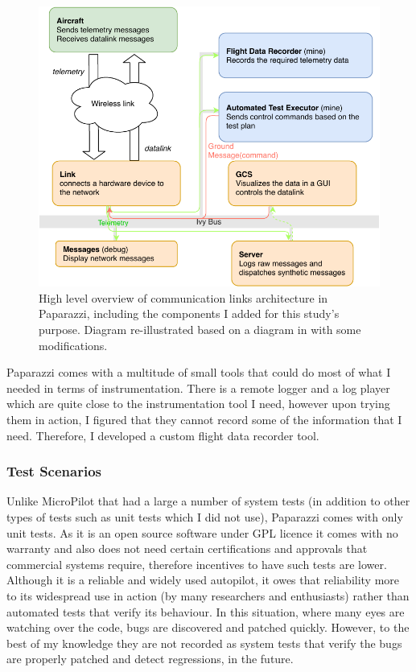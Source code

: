 \begin{figure}
    \centering
    \includegraphics[width=\columnwidth]{pprz_tester_files/Pprz_communication_agents.pdf}
    \caption{High level overview of communication links architecture in Paparazzi, including the components I added for this study's purpose. Diagram re-illustrated based on a diagram in \cite{hattenberger2014using} with some modifications.}
    \label{fig:paparazzi_comm_agents}
\end{figure}

Paparazzi comes with a multitude of small tools that could do most of what I needed in terms of instrumentation. There is a remote logger and a log player which are quite close to the instrumentation tool I need, however upon trying them in action, I figured that they cannot record some of the information that I need. Therefore, I developed a custom flight data recorder tool. 

\subsubsection{Test Scenarios}
Unlike MicroPilot that had a large a number of system tests (in addition to other types of tests such as unit tests which I did not use), Paparazzi comes with only unit tests. As it is an open source software under GPL licence it comes with no warranty and also does not need certain certifications and approvals that commercial systems require, therefore incentives to have such tests are lower. 
Although it is a reliable and widely used autopilot, it owes that reliability more to its widespread use in action (by many researchers and enthusiasts) rather than automated tests that verify its behaviour.
In this situation, where many eyes are watching over the code, bugs are discovered and patched quickly. However, to the best of my knowledge they are not recorded as system tests that verify the bugs are properly patched and detect regressions, in the future.

